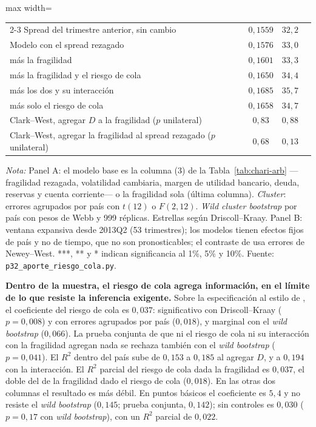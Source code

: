 \begin{table}[htbp]
\begin{adjustbox}{max width=\linewidth}
\begin{tabular}{l ccc}
\cmidrule(lr){2-3}
\quad Spread del trimestre anterior, sin cambio & $0{,}1559$ & $32{,}2$ & \\
\quad Modelo con el spread rezagado & $0{,}1576$ & $33{,}0$ & \\
\quad \quad más la fragilidad & $0{,}1601$ & $33{,}3$ & \\
\quad \quad más la fragilidad y el riesgo de cola & $0{,}1650$ & $34{,}4$ & \\
\quad \quad más los dos y su interacción & $0{,}1685$ & $35{,}7$ & \\
\quad \quad más solo el riesgo de cola & $0{,}1658$ & $34{,}7$ & \\
\quad Clark--West, agregar $D$ a la fragilidad ($p$ unilateral) & $0{,}83$ & $0{,}88$ & \\
\quad Clark--West, agregar la fragilidad al spread rezagado ($p$ unilateral) & $0{,}68$ & $0{,}13$ & \\
\bottomrule
\end{tabular}
\end{adjustbox}
\par\smallskip\parbox{0.95\linewidth}{\footnotesize \textit{Nota:} Panel A: el modelo base es la columna (3) de la Tabla~\ref{tab:chari-arb} ---fragilidad rezagada, volatilidad cambiaria, margen de utilidad bancario, deuda, reservas y cuenta corriente--- o la fragilidad sola (última columna). \textit{Cluster}: errores agrupados por país con $t(12)$ o $F(2,12)$. \textit{Wild cluster bootstrap} por país con pesos de Webb y 999 réplicas. Estrellas según Driscoll--Kraay. Panel B: ventana expansiva desde 2013Q2 (53 trimestres); los modelos tienen efectos fijos de país y no de tiempo, que no son pronosticables; el contraste de \citet{ClarkWest2007} usa errores de Newey--West. ***, ** y * indican significancia al 1\%, 5\% y 10\%. Fuente: \texttt{p32\_aporte\_riesgo\_cola.py}.}
\end{table}

\textbf{Dentro de la muestra, el riesgo de cola agrega información, en el límite de lo que resiste la inferencia exigente.} Sobre la especificación al estilo de \citet{Chari2024b}, el coeficiente del riesgo de cola es $0{,}037$: significativo con Driscoll--Kraay ($p=0{,}008$) y con errores agrupados por país ($0{,}018$), y marginal con el \textit{wild bootstrap} ($0{,}066$). La prueba conjunta de que ni el riesgo de cola ni su interacción con la fragilidad agregan nada se rechaza también con el \textit{wild bootstrap} ($p=0{,}041$). El $R^2$ dentro del país sube de $0{,}153$ a $0{,}185$ al agregar $D$, y a $0{,}194$ con la interacción. El $R^2$ parcial del riesgo de cola dada la fragilidad es $0{,}037$, el doble del de la fragilidad dado el riesgo de cola ($0{,}018$). En las otras dos columnas el resultado es más débil. En puntos básicos el coeficiente es $5{,}4$ y no resiste el \textit{wild bootstrap} ($0{,}145$; prueba conjunta, $0{,}142$); sin controles es $0{,}030$ ($p=0{,}17$ con \textit{wild bootstrap}), con un $R^2$ parcial de $0{,}022$.

